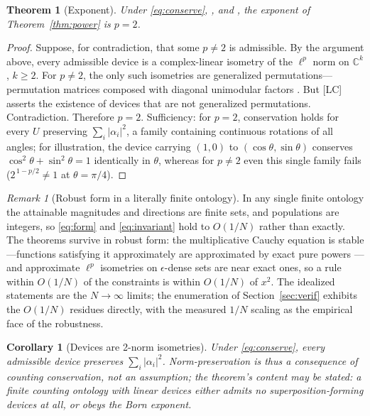 \documentclass[11pt]{article}
\newtheorem{theorem}{Theorem}
\newtheorem{corollary}{Corollary}
\theoremstyle{definition}
\theoremstyle{remark}
\newtheorem{remark}{Remark}
\begin{document}
\begin{theorem}[Exponent]\label{thm:exponent}
Under \eqref{eq:conserve}, {\upshape[PR]}, and {\upshape[LC]}, the exponent of Theorem~\ref{thm:power} is $p = 2$.
\end{theorem}
\begin{proof}
Suppose, for contradiction, that some $p \neq 2$ is admissible. By the argument above, every admissible device is a complex-linear isometry of the $\ell^p$ norm on $\mathbb{C}^k$, $k \ge 2$. For $p \neq 2$, the only such isometries are generalized permutations---permutation matrices composed with diagonal unimodular factors \cite{Lamperti1958}. But [LC] asserts the existence of devices that are not generalized permutations. Contradiction. Therefore $p = 2$. Sufficiency: for $p = 2$, conservation holds for every $U$ preserving $\sum_i |\alpha_i|^2$, a family containing continuous rotations of all angles; for illustration, the device carrying $(1,0)$ to $(\cos\theta, \sin\theta)$ conserves $\cos^2\theta + \sin^2\theta = 1$ identically in $\theta$, whereas for $p \neq 2$ even this single family fails ($2^{\,1-p/2} \neq 1$ at $\theta = \pi/4$).
\end{proof}

\begin{remark}[Robust form in a literally finite ontology]\label{rem:robust}
In any single finite ontology the attainable magnitudes and directions are finite sets, and populations are integers, so \eqref{eq:form} and \eqref{eq:invariant} hold to $O(1/N)$ rather than exactly. The theorems survive in robust form: the multiplicative Cauchy equation is stable---functions satisfying it approximately are approximated by exact pure powers \cite{Hyers1941}---and approximate $\ell^p$ isometries on $\epsilon$-dense sets are near exact ones, so a rule within $O(1/N)$ of the constraints is within $O(1/N)$ of $x^2$. The idealized statements are the $N \to \infty$ limits; the enumeration of Section~\ref{sec:verif} exhibits the $O(1/N)$ residues directly, with the measured $1/N$ scaling as the empirical face of the robustness.
\end{remark}

\begin{corollary}[Devices are 2-norm isometries]\label{cor:unitary}
Under \eqref{eq:conserve}, every admissible device preserves $\sum_i |\alpha_i|^2$. Norm-preservation is thus a consequence of counting conservation, not an assumption; the theorem's content may be stated: a finite counting ontology with linear devices either admits no superposition-forming devices at all, or obeys the Born exponent.
\end{corollary}
\end{document}
